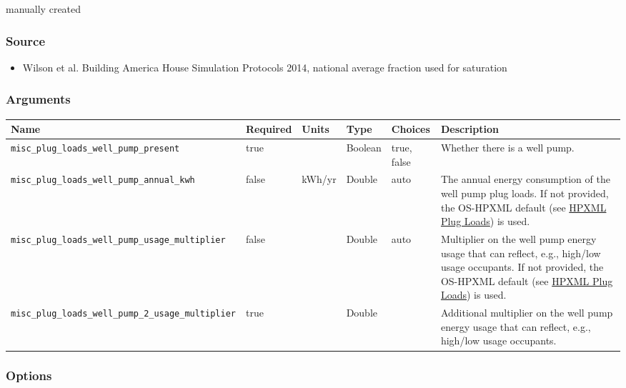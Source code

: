 manually created

\subsubsection{Source}\label{source-122}

\begin{itemize}
 
\item
  Wilson et al. \textquotesingle Building America House Simulation
  Protocols\textquotesingle{} 2014, national average fraction used for
  saturation
\end{itemize}

\subsubsection{Arguments}\label{arguments-83}

\begin{longtable}[]{@{}llllll@{}}
\toprule\noalign{}
Name & Required & Units & Type & Choices & Description \\
\midrule\noalign{}
\endhead
\bottomrule\noalign{}
\endlastfoot
\texttt{misc\_plug\_loads\_well\_pump\_present} & true & & Boolean &
true, false & Whether there is a well pump. \\
\texttt{misc\_plug\_loads\_well\_pump\_annual\_kwh} & false & kWh/yr &
Double & auto & The annual energy consumption of the well pump plug
loads. If not provided, the OS-HPXML default (see
\href{https://openstudio-hpxml.readthedocs.io/en/v1.7.0/workflow_inputs.html\#hpxml-plug-loads}{HPXML
Plug Loads}) is used. \\
\texttt{misc\_plug\_loads\_well\_pump\_usage\_multiplier} & false & &
Double & auto & Multiplier on the well pump energy usage that can
reflect, e.g., high/low usage occupants. If not provided, the OS-HPXML
default (see
\href{https://openstudio-hpxml.readthedocs.io/en/v1.7.0/workflow_inputs.html\#hpxml-plug-loads}{HPXML
Plug Loads}) is used. \\
\texttt{misc\_plug\_loads\_well\_pump\_2\_usage\_multiplier} & true & &
Double & & Additional multiplier on the well pump energy usage that can
reflect, e.g., high/low usage occupants. \\
\end{longtable}

\subsubsection{Options}\label{options-123}

